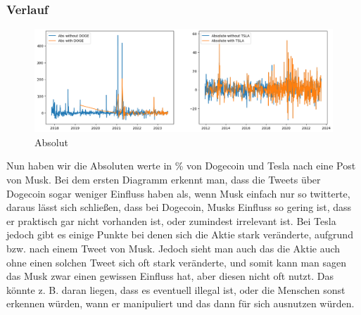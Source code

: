 \documentclass{article}
\begin{document}
\subsubsection{Verlauf}
\begin{figure}[!htb]
  	\includegraphics[width=\textwidth, center]{./imgs/Absolut.png}
 	\caption{Absolut}
 	\label{fig:Absolut}
\end{figure}
Nun haben wir die Absoluten werte in \% von Dogecoin und Tesla nach eine Post von Musk. Bei dem ersten Diagramm erkennt man, dass die Tweets über Dogecoin sogar weniger Einfluss haben als, wenn Musk einfach nur so twitterte, daraus lässt sich schließen, dass bei Dogecoin, Musks Einfluss so gering ist, dass er praktisch gar nicht vorhanden ist, oder zumindest irrelevant ist. Bei Tesla jedoch gibt es einige Punkte bei denen sich die Aktie stark veränderte, aufgrund bzw. nach einem Tweet von Musk. Jedoch sieht man auch das die Aktie auch ohne einen solchen Tweet sich oft stark veränderte, und somit kann man sagen das Musk zwar einen gewissen Einfluss hat, aber diesen nicht oft nutzt. Das könnte z. B. daran liegen, dass es eventuell illegal ist, oder die Menschen sonst erkennen würden, wann er manipuliert und das dann für sich ausnutzen würden.
\end{document}
